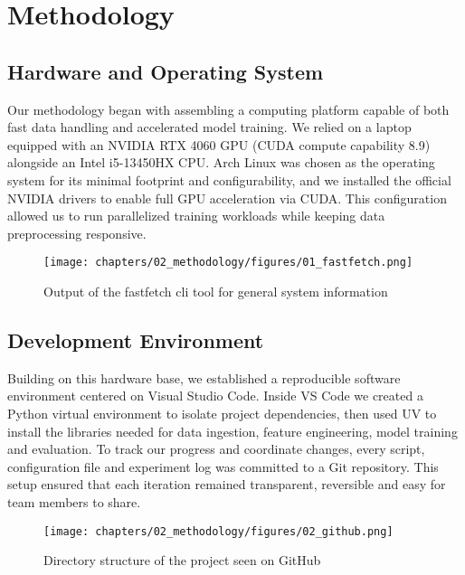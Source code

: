 \chapter{Methodology}
\label{chap:methodology}
\setlength{\parskip}{1em}

\section{Hardware and Operating System}

Our methodology began with assembling a computing platform capable of both fast data handling and accelerated model training. We relied on a laptop equipped with an NVIDIA RTX 4060 GPU (CUDA compute capability 8.9) alongside an Intel i5-13450HX CPU. Arch Linux was chosen as the operating system for its minimal footprint and configurability, and we installed the official NVIDIA drivers to enable full GPU acceleration via CUDA. This configuration allowed us to run parallelized training workloads while keeping data preprocessing responsive.

\begin{figure}[H]
    \centering
    \texttt{[image: chapters/02\_methodology/figures/01\_fastfetch.png]}
    \caption{Output of the fastfetch cli tool for general system information}
\end{figure}

\section{Development Environment}

Building on this hardware base, we established a reproducible software environment centered on Visual Studio Code. Inside VS Code we created a Python virtual environment to isolate project dependencies, then used UV to install the libraries needed for data ingestion, feature engineering, model training and evaluation. To track our progress and coordinate changes, every script, configuration file and experiment log was committed to a Git repository. This setup ensured that each iteration remained transparent, reversible and easy for team members to share.

\begin{figure}[H]
    \centering
    \texttt{[image: chapters/02\_methodology/figures/02\_github.png]}
    \caption{Directory structure of the project seen on GitHub}
\end{figure}

